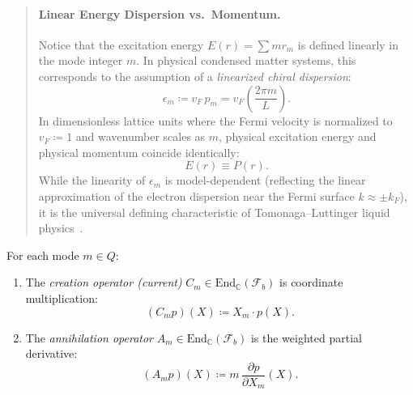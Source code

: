 \begin{quote}
\item[]\paragraph{Linear Energy Dispersion vs.\ Momentum.}
Notice that the excitation energy $E(r) = \sum m r_m$ is defined linearly in the mode integer $m$. In physical condensed matter systems, this corresponds to the assumption of a \emph{linearized chiral dispersion}:
\begin{equation}
\epsilon_m \coloneqq v_F\, p_m = v_F \left(\frac{2\pi m}{L}\right).
\end{equation}
In dimensionless lattice units where the Fermi velocity is normalized to $v_F \coloneqq 1$ and wavenumber scales as $m$, physical excitation energy and physical momentum coincide identically:
\begin{equation}
E(r) \equiv P(r).
\end{equation}
While the linearity of $\epsilon_m$ is model-dependent (reflecting the linear approximation of the electron dispersion near the Fermi surface $k \approx \pm k_F$), it is the universal defining characteristic of Tomonaga--Luttinger liquid physics~\cite{haldane1981, giamarchi2004}.

\end{quote}

\begin{definition}
For each mode $m \in Q$:
\begin{enumerate}
    \item The \emph{creation operator (current)} $C_m \in \mathrm{End}_{\mathbb{C}}(\mathcal{F}_b)$ is coordinate multiplication:
    \begin{equation}
    (C_m p)(X) \coloneqq X_m \cdot p(X).
    \end{equation}
    \item The \emph{annihilation operator} $A_m \in \mathrm{End}_{\mathbb{C}}(\mathcal{F}_b)$ is the weighted partial derivative:
    \begin{equation}
    (A_m p)(X) \coloneqq m\, \frac{\partial p}{\partial X_m}(X).
    \end{equation}
\end{enumerate}
\end{definition}

